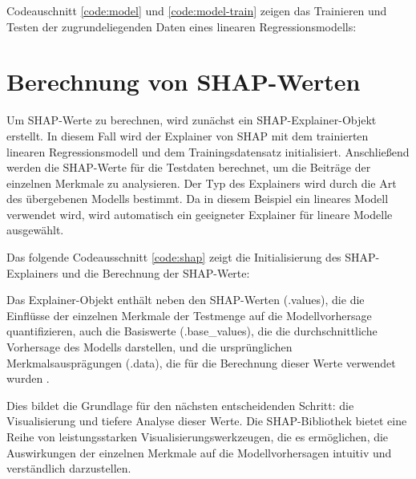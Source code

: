 Codeauschnitt \ref{code:model} und \ref{code:model-train} zeigen das Trainieren und Testen der zugrundeliegenden Daten 
eines linearen Regressionsmodells:







\section{Berechnung von SHAP-Werten}

Um SHAP-Werte zu berechnen, wird zunächst ein SHAP-Explainer-Objekt erstellt. In diesem Fall wird der Explainer 
von SHAP mit dem trainierten linearen Regressionsmodell und dem Trainingsdatensatz initialisiert. 
Anschließend werden die SHAP-Werte für die Testdaten berechnet, um die Beiträge der einzelnen Merkmale 
zu analysieren. Der Typ des Explainers wird durch die Art des übergebenen Modells bestimmt. 
Da in diesem Beispiel ein lineares Modell verwendet wird, wird automatisch ein geeigneter Explainer 
für lineare Modelle ausgewählt.

Das folgende Codeausschnitt \ref{code:shap} zeigt die Initialisierung des SHAP-Explainers und die Berechnung der SHAP-Werte:



Das Explainer-Objekt enthält neben den SHAP-Werten (.values), 
die die Einflüsse der einzelnen Merkmale der Testmenge auf die Modellvorhersage quantifizieren, 
auch die Basiswerte (.base\_values), die die durchschnittliche Vorhersage des Modells darstellen, 
und die ursprünglichen Merkmalsausprägungen (.data), die für die Berechnung dieser Werte verwendet wurden \cite[S. 51]{Molnar_2023}.

Dies bildet die Grundlage für den nächsten entscheidenden Schritt: 
die Visualisierung und tiefere Analyse dieser Werte. Die SHAP-Bibliothek bietet eine 
Reihe von leistungsstarken Visualisierungswerkzeugen, die es ermöglichen, die Auswirkungen 
der einzelnen Merkmale auf die Modellvorhersagen intuitiv und verständlich darzustellen. 

